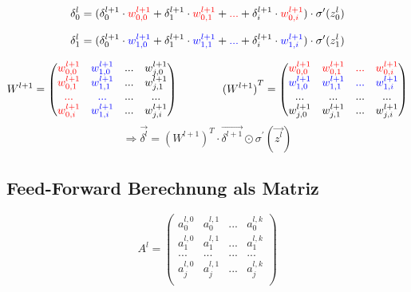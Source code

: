 \documentclass{article}
\begin{document}
\[ \delta_0^l = (\delta_0^{l+1} \cdot \textcolor{red}{w_{0,0}^{l+1}} + \delta_1^{l+1} \cdot \textcolor{red}{w_{0,1}^{l+1}}
 + \textcolor{red}{...} + \delta_i^{l+1} \cdot \textcolor{red}{w_{0,i}^{l+1}}) \cdot \sigma^{\prime}(z_0^{l}) \]

 \[ \delta_1^l = (\delta_0^{l+1} \cdot \textcolor{blue}{w_{1,0}^{l+1}} + \delta_1^{l+1} \cdot \textcolor{blue}{w_{1,1}^{l+1}}
 + \textcolor{blue}{...} + \delta_i^{l+1} \cdot \textcolor{blue}{w_{1,i}^{l+1}}) \cdot \sigma^{\prime}(z_1^{l}) \]

\[ W^{l+1} = \begin{pmatrix}
    \textcolor{red}{w_{0,0}^{l+1}} & \textcolor{blue}{w_{1,0}^{l+1}} & ... & w_{j,0}^{l+1} \\
    \textcolor{red}{w_{0,1}^{l+1}} & \textcolor{blue}{w_{1,1}^{l+1}} & ... & w_{j,1}^{l+1} \\
    \textcolor{red}{...} & \textcolor{blue}{...} & ... & ... \\
    \textcolor{red}{w_{0,i}^{l+1}} & \textcolor{blue}{w_{1,i}^{l+1}} & ... & w_{j,i}^{l+1}
\end{pmatrix} 
\kern 40pt
{(W^{l+1})}^T = \begin{pmatrix}
    \textcolor{red}{w_{0,0}^{l+1}} & \textcolor{red}{w_{0,1}^{l+1}} & \textcolor{red}{...} & \textcolor{red}{w_{0,i}^{l+1}} \\
    \textcolor{blue}{w_{1,0}^{l+1}} & \textcolor{blue}{w_{1,1}^{l+1}} & \textcolor{blue}{...} & \textcolor{blue}{w_{1,i}^{l+1}} \\
    ... & ... & ... & ... \\
    w_{j,0}^{l+1} & w_{j,1}^{l+1} & ... & w_{j,i}^{l+1} 
\end{pmatrix} \]
\[ \Rightarrow \vec{\delta^l} = {(W^{l+1})}^T \cdot \vec{\delta^{l+1}} \odot \sigma^{\prime}(\vec{z^l}) \]


 \subsection{Feed-Forward Berechnung als Matriz}

 \[ A^l = 
 \begin{pmatrix}
    a_0^{l,0} & a_0^{l,1} & ... & a_0^{l,k} \\
    a_1^{l,0} & a_1^{l,1} & ... & a_1^{l,k} \\
    ... & ... & ... & ... \\
    a_j^{l,0} & a_j^{l,1} & ... & a_j^{l,k} \\
 \end{pmatrix} \]
\end{document}
